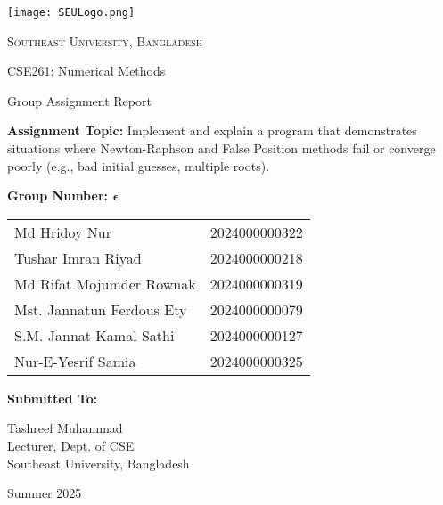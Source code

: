 \documentclass[12pt,a4paper]{article}
\begin{document}
\begin{titlepage}
    \centering
    \texttt{[image: SEULogo.png]}\par\vspace{1cm}
    {\scshape\LARGE Southeast University, Bangladesh \par}
    \vspace{1cm}
    {\Large CSE261: Numerical Methods \par}
    \vspace{0.5cm}
    {\Large Group Assignment Report \par}
    \vspace{1.5cm}
    {\large \textbf{Assignment Topic:} Implement and explain a program that demonstrates situations where Newton-Raphson and False Position methods fail or converge poorly (e.g., bad initial guesses, multiple roots). \par}
    \vfill
    \textbf{Group Number: $\boldsymbol\epsilon$ } \par
    \begin{tabular}{ll}
       Md Hridoy Nur & 2024000000322 \\
       Tushar Imran Riyad  & 2024000000218 \\
       Md Rifat Mojumder Rownak & 2024000000319 \\
       Mst. Jannatun Ferdous Ety & 2024000000079 \\
       S.M. Jannat Kamal Sathi & 2024000000127 \\
       Nur-E-Yesrif Samia & 2024000000325 \\
    \end{tabular}
    \vfill

    \textbf{Submitted To:}  \par
    [TMD] Tashreef Muhammad  \\
    Lecturer, Dept. of CSE  \\
    Southeast University, Bangladesh \par
    \vfill
    Summer 2025
\end{titlepage}
\end{document}
